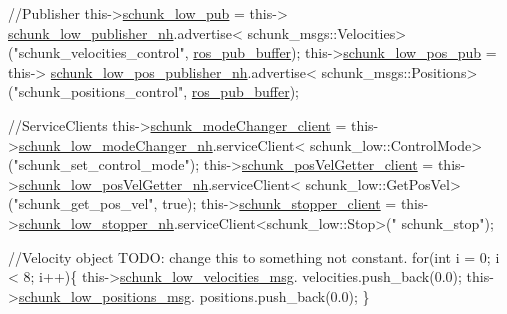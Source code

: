 \begin{DoxyCode}
        \textcolor{comment}{//Publisher}
        this->\hyperlink{classCartesian__controller_aa6ce9cffdd307127ed814d6e5132eba2}{schunk\_low\_pub}                       = this->
      \hyperlink{classCartesian__controller_a7df4ce63bf0551bfa7061bc718cd68d2}{schunk\_low\_publisher\_nh}.advertise<
      schunk\_msgs::Velocities>(\textcolor{stringliteral}{"schunk\_velocities\_control"}, \hyperlink{classCartesian__controller_ab9ed5a808da204dbc612d313dc7332f4}{ros\_pub\_buffer});
        this->\hyperlink{classCartesian__controller_af06313084ef058d1f979fddeb33d5100}{schunk\_low\_pos\_pub}                   = this->
      \hyperlink{classCartesian__controller_aabe48e7ab08b0235d4cd94213b8faf5d}{schunk\_low\_pos\_publisher\_nh}.advertise<
      schunk\_msgs::Positions>(\textcolor{stringliteral}{"schunk\_positions\_control"}, \hyperlink{classCartesian__controller_ab9ed5a808da204dbc612d313dc7332f4}{ros\_pub\_buffer});

        \textcolor{comment}{//ServiceClients}
        this->\hyperlink{classCartesian__controller_aee1fc445b64c534847ff0012132a5d2c}{schunk\_modeChanger\_client}               
      = this->\hyperlink{classCartesian__controller_ad90134b232217e84cb58137a9d2030bb}{schunk\_low\_modeChanger\_nh}.serviceClient<
      schunk\_low::ControlMode>(\textcolor{stringliteral}{"schunk\_set\_control\_mode"});
        this->\hyperlink{classCartesian__controller_a5c1d9386bc5f219f2edc0d5d1b21f0da}{schunk\_posVelGetter\_client}             
      = this->\hyperlink{classCartesian__controller_aeed01809bd5240663c7acfade245a386}{schunk\_low\_posVelGetter\_nh}.serviceClient<
      schunk\_low::GetPosVel>(\textcolor{stringliteral}{"schunk\_get\_pos\_vel"}, \textcolor{keyword}{true});
        this->\hyperlink{classCartesian__controller_a4ea7350e0f797c49bc51d3433a761aff}{schunk\_stopper\_client}                = 
      this->\hyperlink{classCartesian__controller_a57b1869ec960e75e435e1f882a02d80e}{schunk\_low\_stopper\_nh}.serviceClient<schunk\_low::Stop>(\textcolor{stringliteral}{"
      schunk\_stop"});

        \textcolor{comment}{//Velocity object TODO: change this to something not constant.}
        \textcolor{keywordflow}{for}(\textcolor{keywordtype}{int} i = 0; i < 8; i++)\{
                this->\hyperlink{classCartesian__controller_af59178c57bdd73d9eb474577247bbe40}{schunk\_low\_velocities\_msg}.
      velocities.push\_back(0.0);
                this->\hyperlink{classCartesian__controller_a2dd700542bd6243eef10d34811055584}{schunk\_low\_positions\_msg}.
      positions.push\_back(0.0);
        \}


\end{DoxyCode}
